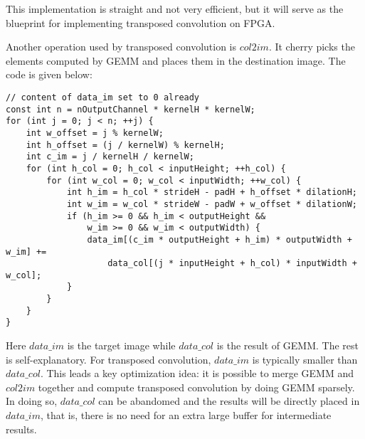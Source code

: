 This implementation is straight and not very efficient, but it will serve as the blueprint for implementing
transposed convolution on FPGA.

Another operation used by transposed convolution is $col2im$. It cherry picks the elements computed by GEMM
and places them in the destination image. The code is given below:

\begin{code}
\begin{verbatim}
// content of data_im set to 0 already
const int n = nOutputChannel * kernelH * kernelW;
for (int j = 0; j < n; ++j) {
    int w_offset = j % kernelW;
    int h_offset = (j / kernelW) % kernelH;
    int c_im = j / kernelH / kernelW;
    for (int h_col = 0; h_col < inputHeight; ++h_col) {
        for (int w_col = 0; w_col < inputWidth; ++w_col) {
            int h_im = h_col * strideH - padH + h_offset * dilationH;
            int w_im = w_col * strideW - padW + w_offset * dilationW;
            if (h_im >= 0 && h_im < outputHeight &&
                w_im >= 0 && w_im < outputWidth) {
                data_im[(c_im * outputHeight + h_im) * outputWidth + w_im] +=
                    data_col[(j * inputHeight + h_col) * inputWidth + w_col];
            }
        }
    }
}
\end{verbatim}
\label{code:col2im}
\end{code}

Here $data\_im$ is the target image while $data\_col$ is the result of GEMM. The rest is self-explanatory.
For transposed convolution, $data\_im$ is typically smaller than $data\_col$. This leads a key optimization
idea: it is possible to merge GEMM and $col2im$ together and compute transposed convolution by doing GEMM
sparsely. In doing so, $data\_col$ can be abandomed and the results will be directly placed in $data\_im$,
that is, there is no need for an extra large buffer for intermediate results.

